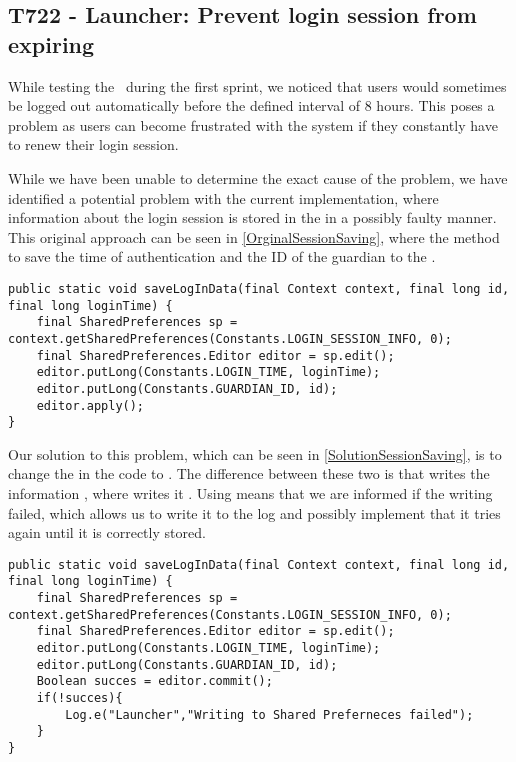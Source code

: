 \subsection{T722 - Launcher: Prevent login session from expiring}\label{T722}
While testing the \lapp\ during the first sprint, we noticed that users would
sometimes be logged out automatically before the defined interval of 8
hours. This poses a problem as users can become frustrated with the system
if they constantly have to renew their login session.\nl

While we have been unable to determine the exact cause of the problem, we have
identified a potential problem with the current implementation, where
information about the login session is stored in the  in
a possibly faulty manner. This original approach can be seen in
\autoref{OrginalSessionSaving}, where the  method to save the time
of authentication and the ID of the guardian to the .\nl

\begin{minipage}[H]{\linewidth}
\begin{lstlisting}[caption = Original approach to saving login session, label =
OrginalSessionSaving]
public static void saveLogInData(final Context context, final long id, final long loginTime) {
    final SharedPreferences sp = context.getSharedPreferences(Constants.LOGIN_SESSION_INFO, 0);
    final SharedPreferences.Editor editor = sp.edit();
    editor.putLong(Constants.LOGIN_TIME, loginTime);
    editor.putLong(Constants.GUARDIAN_ID, id);
    editor.apply();
}
\end{lstlisting} 
\end{minipage}
 
Our solution to this problem, which can be seen in
\autoref{SolutionSessionSaving}, is to change the  in the code to
. The difference between these two is that
 writes the information , where 
writes it  \citep{SPApply}. Using  means that
we are informed if the writing failed, which allows us to write it to the log and
possibly implement that it tries again until it is correctly stored.\nl

\begin{minipage}[H]{\linewidth}
\begin{lstlisting}[caption = Our solution to saving login session, label
=SolutionSessionSaving ]
public static void saveLogInData(final Context context, final long id, final long loginTime) {
    final SharedPreferences sp = context.getSharedPreferences(Constants.LOGIN_SESSION_INFO, 0);
    final SharedPreferences.Editor editor = sp.edit();
    editor.putLong(Constants.LOGIN_TIME, loginTime);
    editor.putLong(Constants.GUARDIAN_ID, id);
    Boolean succes = editor.commit();
    if(!succes){
    	Log.e("Launcher","Writing to Shared Preferneces failed");
	}
} 
\end{lstlisting} 
\end{minipage}

